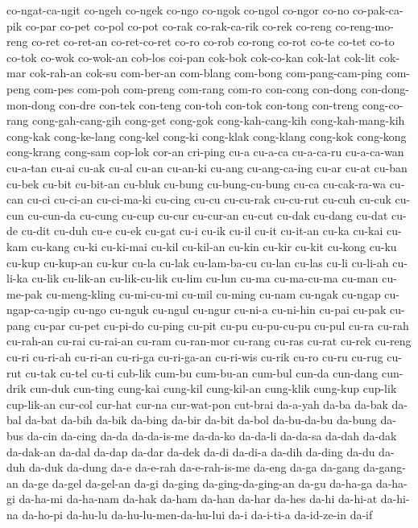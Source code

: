 {co-ngat-ca-ngit co-ngeh co-ngek co-ngo co-ngok co-ngol co-ngor co-no
co-pak-ca-pik co-par co-pet co-pol co-pot co-rak co-rak-ca-rik co-rek
co-reng co-reng-mo-reng co-ret co-ret-an co-ret-co-ret co-ro co-rob
co-rong co-rot co-te co-tet co-to co-tok co-wok co-wok-an cob-los coi-pan
cok-bok cok-co-kan cok-lat cok-lit cok-mar cok-rah-an cok-su com-ber-an
com-blang com-bong com-pang-cam-ping com-peng com-pes com-poh com-preng
com-rang com-ro con-cong con-dong con-dong-mon-dong con-dre con-tek
con-teng con-toh con-tok con-tong con-treng cong-co-rang cong-gah-cang-gih
cong-get cong-gok cong-kah-cang-kih cong-kah-mang-kih cong-kak
cong-ke-lang cong-kel cong-ki cong-klak cong-klang cong-kok cong-kong
cong-krang cong-sam cop-lok cor-an cri-ping cu-a cu-a-ca cu-a-ca-ru
cu-a-ca-wan cu-a-tan cu-ai cu-ak cu-al cu-an cu-an-ki cu-ang cu-ang-ca-ing
cu-ar cu-at cu-ban cu-bek cu-bit cu-bit-an cu-bluk cu-bung cu-bung-cu-bung
cu-ca cu-cak-ra-wa cu-can cu-ci cu-ci-an cu-ci-ma-ki cu-cing cu-cu
cu-cu-rak cu-cu-rut cu-cuh cu-cuk cu-cun cu-cun-da cu-cung cu-cup cu-cur
cu-cur-an cu-cut cu-dak cu-dang cu-dat cu-de cu-dit cu-duh cu-e cu-ek
cu-gat cu-i cu-ik cu-il cu-it cu-it-an cu-ka cu-kai cu-kam cu-kang cu-ki
cu-ki-mai cu-kil cu-kil-an cu-kin cu-kir cu-kit cu-kong cu-ku cu-kup
cu-kup-an cu-kur cu-la cu-lak cu-lam-ba-cu cu-lan cu-las cu-li cu-li-ah
cu-li-ka cu-lik cu-lik-an cu-lik-cu-lik cu-lim cu-lun cu-ma cu-ma-cu-ma
cu-man cu-me-pak cu-meng-kling cu-mi-cu-mi cu-mil cu-ming cu-nam cu-ngak
cu-ngap cu-ngap-ca-ngip cu-ngo cu-nguk cu-ngul cu-ngur cu-ni-a cu-ni-hin
cu-pai cu-pak cu-pang cu-par cu-pet cu-pi-do cu-ping cu-pit cu-pu
cu-pu-cu-pu cu-pul cu-ra cu-rah cu-rah-an cu-rai cu-rai-an cu-ram
cu-ran-mor cu-rang cu-ras cu-rat cu-rek cu-reng cu-ri cu-ri-ah cu-ri-an
cu-ri-ga cu-ri-ga-an cu-ri-wis cu-rik cu-ro cu-ru cu-rug cu-rut cu-tak
cu-tel cu-ti cub-lik cum-bu cum-bu-an cum-bul cun-da cun-dang cun-drik
cun-duk cun-ting cung-kai cung-kil cung-kil-an cung-klik cung-kup cup-lik
cup-lik-an cur-col cur-hat cur-na cur-wat-pon cut-brai da-a-yah da-ba
da-bak da-bal da-bat da-bih da-bik da-bing da-bir da-bit da-bol
da-bu-da-bu da-bung da-bus da-cin da-cing da-da da-da-is-me da-da-ko
da-da-li da-da-sa da-dah da-dak da-dak-an da-dal da-dap da-dar da-dek
da-di da-di-a da-dih da-ding da-du da-duh da-duk da-dung da-e da-e-rah
da-e-rah-is-me da-eng da-ga da-gang da-gang-an da-ge da-gel da-gel-an
da-gi da-ging da-ging-da-ging-an da-gu da-ha-ga da-ha-gi da-ha-mi
da-ha-nam da-hak da-ham da-han da-har da-hes da-hi da-hi-at da-hi-na
da-ho-pi da-hu-lu da-hu-lu-men-da-hu-lui da-i da-i-ti-a da-id-ze-in da-if
}
